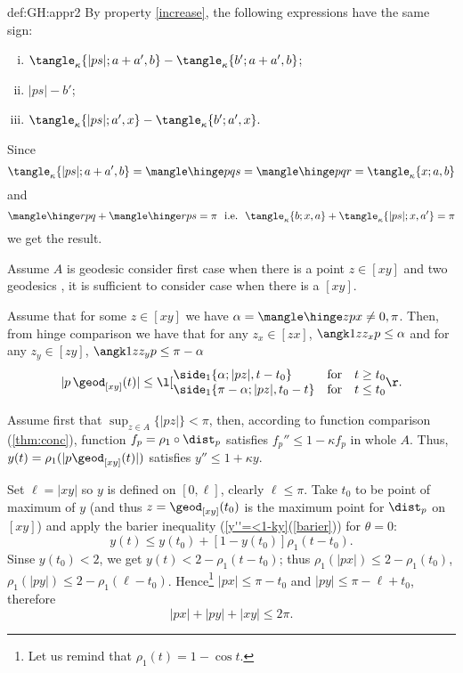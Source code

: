 {\begin{subthm}{def:GH:appr2}
By property \ref{increase}, the following expressions have the same sign:
\begin{enumerate}[(i)]
\item $\tangle_\kappa\{|p s|;a+a',b\}
-\tangle_\kappa\{b';a+a',b\}$;
\item $|p s|-b'$;
\item $\tangle_\kappa\{|p s|;a',x\}-\tangle_\kappa\{b';a',x\}.$
\end{enumerate}
Since $$\tangle_\kappa\{|p s|;a+a',b\}=\mangle\hinge pqs =\mangle\hinge pqr=\tangle_\kappa\{x;a,b\}$$ 
and
$$\mangle\hinge rpq+\mangle\hinge rps=\pi\ \ \text{i.e.}\ \ \tangle_\kappa\{b;x,a\}+\tangle_\kappa\{|p s|;x,a'\}=\pi$$
we get the result.\qeds









Assume $A$ is geodesic consider first case when there is a point $z\in [x y]$ and two geodesics , it is sufficient to consider case when there is a $[xy]$.

Assume that for some $z\in[xy]$ we have $\alpha=\mangle\hinge z p x\not=0,\pi$.
Then, from hinge comparison we have that for any $z_x\in[zx]$,
$\angk1z{z_x}p\le\alpha$ and for any $z_y\in[zy]$,
$\angk1z{z_y}p\le\pi-\alpha$
$$|p\,\geod_{[xy]}(t)|\le 
\l[\begin{matrix}
\side_1\{\alpha;|pz|,t-t_0\}\ \ \ \ \ \,&\text{for}&t\ge t_0\\
\side_1\{\pi-\alpha;|pz|,t_0-t\}&\text{for}&t\le t_0
\end{matrix}\r.
$$








Assume first that $\sup_{z\in A}\{|pz|\}<\pi$, then, according to function comparison (\ref{thm:conc}), function $f_p=\rho_1\circ\dist_p$ satisfies $f_p''\le 1-\kappa f_p$ in whole $A$.
Thus, $y(t)=\rho_1(|p\geod_{[xy]}(t)|)$ 
satisfies $y''\le 1+\kappa y$.

Set $\ell=|xy|$ so $y$ is defined on $[0,\ell]$, clearly $\ell\le\pi$.
Take $t_0$ to be point of maximum of $y$ (and thus $z=\geod_{[xy]}(t_0)$ is the maximum point for $\dist_p$ on $[x y]$) and apply the barier inequality (\ref{y''=<1-ky}(\ref{barier})) for $\theta=0$:
$$y(t)
\le y(t_0)+[1-y(t_0)]\rho_1(t-t_0).$$
Sinse $y(t_0)< 2$, we get 
$y(t)<2-\rho_1(t-t_0)$; thus
$\rho_1(|px|)\le 2-\rho_1(t_0)$, $\rho_1(|py|)\le 2-\rho_1(\ell-t_0)$.
Hence\footnote{Let us remind that $\rho_1(t)=1-\cos t$.} $|px|\le \pi-t_0$ and $|py|\le \pi-\ell+t_0$, therefore 
$$|px|+|py|+|xy|\le 2\pi.$$









\end{subthm}}
